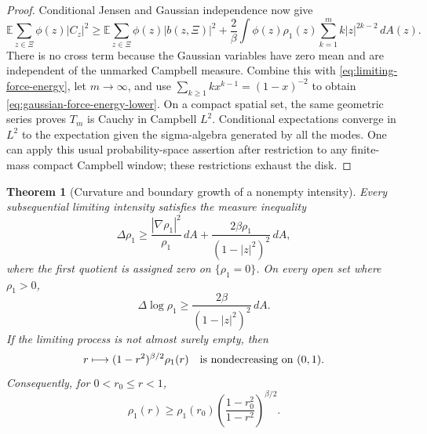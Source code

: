 \documentclass[11pt,a4paper]{article}
\numberwithin{equation}{section}
\newtheorem{theorem}{Theorem}[section]
\theoremstyle{definition}
\theoremstyle{remark}
\newcommand{\E}{\mathbb E}
\begin{document}
\begin{proof}
Conditional Jensen and Gaussian independence now give
\[
 \E\sum_{z\in\Xi}\phi(z)|C_z|^2
 \ge\E\sum_{z\in\Xi}\phi(z)|b(z,\Xi)|^2
       +\frac2\beta\int\phi(z)\rho_1(z)
                         \sum_{k=1}^m k|z|^{2k-2}\,dA(z).
\]
There is no cross term because the Gaussian variables have zero mean
and are independent of the unmarked Campbell measure. Combine this
with \eqref{eq:limiting-force-energy}, let $m\to\infty$, and use
$\sum_{k\ge1}kx^{k-1}=(1-x)^{-2}$ to obtain
\eqref{eq:gaussian-force-energy-lower}. On a compact spatial set,
the same geometric series proves $T_m$ is Cauchy in Campbell $L^2$.
Conditional expectations converge in $L^2$ to the expectation given
the sigma-algebra generated by all the modes. One can apply this usual
probability-space assertion after restriction to any finite-mass
compact Campbell window; these restrictions exhaust the disk.
\end{proof}



\begin{theorem}[Curvature and boundary growth of a nonempty intensity]
\label{thm:limiting-intensity-curvature}
Every subsequential limiting intensity satisfies the measure inequality
\begin{equation}\label{eq:intensity-curvature-raw}
 \Delta\rho_1
 \ge\frac{|\nabla\rho_1|^2}{\rho_1}\,dA
       +\frac{2\beta\rho_1}{(1-|z|^2)^2}\,dA,
\end{equation}
where the first quotient is assigned zero on $\{\rho_1=0\}$.
On every open set where $\rho_1>0$,
\begin{equation}\label{eq:intensity-log-curvature-lower}
 \Delta\log\rho_1\ge\frac{2\beta}{(1-|z|^2)^2}\,dA.
\end{equation}
If the limiting process is not almost surely empty, then
\begin{equation}\label{eq:weighted-intensity-monotonicity}
 r\longmapsto (1-r^2)^{\beta/2}\rho_1(r)
 \quad\hbox{is nondecreasing on }(0,1).
\end{equation}
Consequently, for $0<r_0\le r<1$,
\begin{equation}\label{eq:nonempty-boundary-growth}
 \rho_1(r)\ge\rho_1(r_0)
             \left(\frac{1-r_0^2}{1-r^2}\right)^{\beta/2}.
\end{equation}
\end{theorem}
\end{document}
